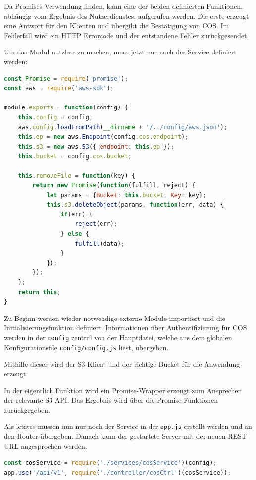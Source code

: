 Da \gls{Promise}s Verwendung finden, kann eine der beiden definierten Funktionen, abhängig vom Ergebnis des Nutzerdienstes, aufgerufen werden. Die erste erzeugt eine Antwort für den Klienten und übergibt die Bestätigung von \ac{COS}. Im Fehlerfall wird ein HTTP Errorcode und der entstandene Fehler zurückgesendet.

Um das Modul nutzbar zu machen, muss jetzt nur noch der Service definiert werden:\\

\begin{lstlisting}[language=JavaScript, caption=CosService.js für die Kommunikation mit IBM COS]
const Promise = require('promise');
const aws = require('aws-sdk');

module.exports = function(config) {
	this.config = config;
	aws.config.loadFromPath(__dirname + '/../config/aws.json');
	this.ep = new aws.Endpoint(config.cos.endpoint);
	this.s3 = new aws.S3({ endpoint: this.ep });
	this.bucket = config.cos.bucket;
	
	this.removeFile = function(key) {
		return new Promise(function(fulfill, reject) {
			let params = {Bucket: this.bucket, Key: key};
			this.s3.deleteObject(params, function(err, data) {
				if(err) {
					reject(err);
				} else {
					fulfill(data);
				}
			});
		});
	};
	return this;
}
\end{lstlisting}

Zu Beginn werden wieder notwendige externe Module importiert und die Initialisierungsfunktion definiert. Informationen über Authentifizierung für \ac{COS} werden in der \lstinline|config| zentral von der Hauptdatei, welche aus dem globalen Konfigurationsfile \lstinline|config/config.js| liest, übergeben.

Mithilfe dieser wird der \ac{S3}-Klient und der richtige Bucket für die Anwendung erzeugt. 

In der eigentlich Funktion wird ein Promise-Wrapper erzeugt zum Ansprechen der relevante S3-API. Das Ergebnis wird über die Promise-Funktionen zurückgegeben.

Als letztes müssen nun nur noch der Service in der \lstinline|app.js| erstellt werden und an den Router übergeben. Danach kann der gestartete Server mit der neuen REST-URL angesprochen werden:\\

\begin{lstlisting}[language=JavaScript, caption=Einbindung der neuen Route in der app.js]
const cosService = require('./services/cosService')(config);
app.use('/api/v1', require('./controller/cosCtrl')(cosService));
\end{lstlisting}

